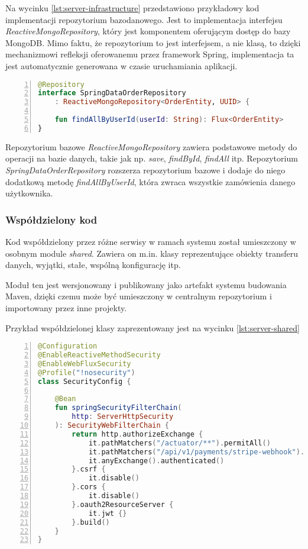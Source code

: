Na wycinku \ref{lst:server-infrastructure} przedstawiono przykładowy kod implementacji repozytorium bazodanowego. Jest to implementacja interfejsu \textit{ReactiveMongoRepository}, który jest komponentem oferującym dostęp do bazy MongoDB. Mimo faktu, że repozytorium to jest interfejsem, a nie klasą, to dzięki mechanizmowi refleksji oferowanemu przez framework Spring, implementacja ta jest automatycznie generowana w czasie uruchamiania aplikacji.

\begin{lstlisting}[caption={Kod implementacji repozytorium bazodanowego},label={lst:server-infrastructure},captionpos=b,language=Kotlin,numbers=left,showstringspaces=false]
@Repository
interface SpringDataOrderRepository 
    : ReactiveMongoRepository<OrderEntity, UUID> {

    fun findAllByUserId(userId: String): Flux<OrderEntity>
}
\end{lstlisting}

Repozytorium bazowe \textit{ReactiveMongoRepository} zawiera podstawowe metody do operacji na bazie danych, takie jak np. \textit{save}, \textit{findById}, \textit{findAll} itp. Repozytorium \textit{SpringDataOrderRepository} rozszerza repozytorium bazowe i dodaje do niego dodatkową metodę \textit{findAllByUserId}, która zwraca wszystkie zamówienia danego użytkownika.

\subsubsection{Współdzielony kod}

Kod współdzielony przez różne serwisy w ramach systemu został umieszczony w osobnym module \textit{shared}. Zawiera on m.in. klasy reprezentujące obiekty transferu danych, wyjątki, stałe, wspólną konfigurację itp.

Moduł ten jest wersjonowany i publikowany jako artefakt systemu budowania Maven, dzięki czemu może być umieszczony w centralnym repozytorium i importowany przez inne projekty.

Przykład współdzielonej klasy zaprezentowany jest na wycinku \ref{lst:server-shared}

\begin{lstlisting}[caption={Kod klasy konfigurującej mechanizm uwierzytelniania i autoryzacji},label={lst:server-shared},captionpos=b,language=Kotlin,numbers=left,showstringspaces=false]
@Configuration
@EnableReactiveMethodSecurity
@EnableWebFluxSecurity
@Profile("!nosecurity")
class SecurityConfig {

    @Bean
    fun springSecurityFilterChain(
        http: ServerHttpSecurity
    ): SecurityWebFilterChain {
        return http.authorizeExchange {
            it.pathMatchers("/actuator/**").permitAll()
            it.pathMatchers("/api/v1/payments/stripe-webhook").permitAll()
            it.anyExchange().authenticated()
        }.csrf {
            it.disable()
        }.cors {
            it.disable()
        }.oauth2ResourceServer {
            it.jwt {}
        }.build()
    }
}
\end{lstlisting}

